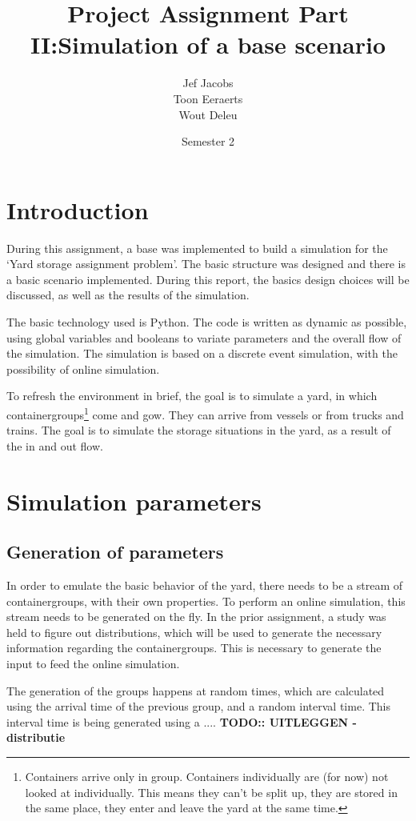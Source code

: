\documentclass[]{article}
\title{Project Assignment Part II:\@ Simulation of a base scenario }
\author{Jef Jacobs \\ Toon Eeraerts \\ Wout Deleu}
\date{Semester 2}
\begin{document}
\setlength{\parindent}{0pt} \maketitle \tableofcontents \newpage %

\section{Introduction}
During this assignment, a base was implemented to build a simulation for the
`Yard storage assignment problem'. The basic structure was designed and there
is a basic scenario implemented. During this report, the basics design choices
will be discussed, as well as the results of the simulation.

The basic technology used is Python. The code is written as dynamic as
possible, using global variables and booleans to variate parameters and the
overall flow of the simulation. The simulation is based on a discrete event
simulation, with the possibility of online simulation.

To refresh the environment in brief, the goal is to simulate a yard, in which
containergroups\footnote{Containers arrive only in group. Containers
	individually are (for now) not looked at individually. This means they can't be
	split up, they are stored in the same place, they enter and leave the yard at
	the same time.} come and gow. They can arrive from vessels or from trucks and
trains. The goal is to simulate the storage situations in the yard, as a result
of the in and out flow.

\section{Simulation parameters}
\subsection{Generation of parameters}
In order to emulate the basic behavior of the yard, there needs to be a stream
of containergroups, with their own properties. To perform an online simulation,
this stream needs to be generated on the fly. In the prior assignment, a study
was held to figure out distributions, which will be used to generate the
necessary information regarding the containergroups. This is necessary to
generate the input to feed the online simulation.

The generation of the groups happens at random times, which are calculated
using the arrival time of the previous group, and a random interval time. This
interval time is being generated using a .... \textbf{TODO:: UITLEGGEN -
	distributie}
\end{document}
